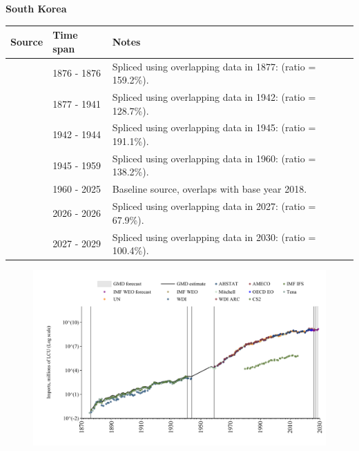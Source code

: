 \documentclass[12pt,a4paper,landscape]{article}
\begin{document}
\begin{adjustbox}{max totalsize={\paperwidth}{\paperheight},center}
\begin{minipage}[t][\textheight][t]{\textwidth}
\begin{figure}[H]
\end{figure}
\end{minipage}
\end{adjustbox}
\begin{adjustbox}{max totalsize={\paperwidth}{\paperheight},center}
\begin{minipage}[t][\textheight][t]{\textwidth}
\vspace*{0.5cm}
{}
\begin{center}
{\Large\bfseries South Korea}
\end{center}
\vspace{0.5cm}
\begin{table}[H]
\centering
\small
\begin{tabular}{|l|l|l|}
\hline
\textbf{Source} & \textbf{Time span} & \textbf{Notes} \\
\hline
\rowcolor{white}\cite{Tena}& 1876 - 1876 &Spliced using overlapping data in 1877: (ratio = 159.2\%).\\
\rowcolor{lightgray}\cite{CS2_KOR}& 1877 - 1941 &Spliced using overlapping data in 1942: (ratio = 128.7\%).\\
\rowcolor{white}\cite{AHSTAT}& 1942 - 1944 &Spliced using overlapping data in 1945: (ratio = 191.1\%).\\
\rowcolor{lightgray}\cite{Mitchell}& 1945 - 1959 &Spliced using overlapping data in 1960: (ratio = 138.2\%).\\
\rowcolor{white}\cite{OECD_EO}& 1960 - 2025 &Baseline source, overlaps with base year 2018.\\
\rowcolor{lightgray}\cite{AMECO}& 2026 - 2026 &Spliced using overlapping data in 2027: (ratio = 67.9\%).\\
\rowcolor{white}\cite{IMF_WEO_forecast}& 2027 - 2029 &Spliced using overlapping data in 2030: (ratio = 100.4\%).\\
\hline
\end{tabular}
\end{table}
\begin{figure}[H]
\centering
\includegraphics[width=\textwidth,height=0.6\textheight,keepaspectratio]{graphs/KOR_imports.pdf}
\end{figure}
\end{minipage}
\end{adjustbox}
\end{document}
